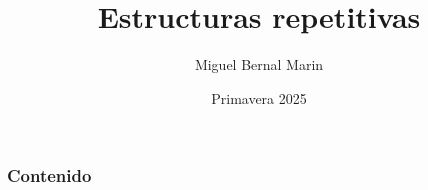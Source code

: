 \documentclass[aspectratio=169]{beamer}
\title{Estructuras repetitivas}
\author{Miguel Bernal Marin}
\institute[ITESO]
{
 ITESO, Universidad \\
 Jesuita de Guadalajara \\
\medskip
\textit{miguel.bernal@iteso.mx}
}
\date{
Primavera 2025
} %
\begin{document}
{ %
  \begin{frame}
  \end{frame}
}

\begin{frame}
    \titlepage
\end{frame}


\begin{frame}
    \frametitle{Contenido}
    \tableofcontents
\end{frame}


\end{document}
